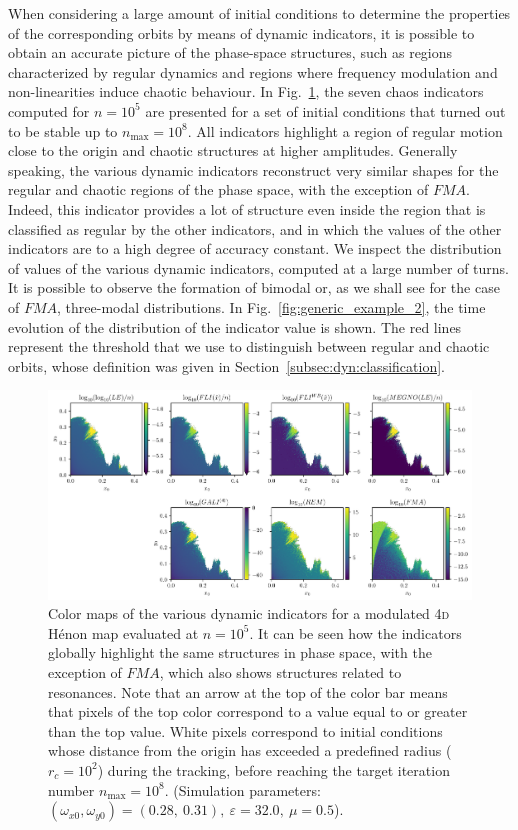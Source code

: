 \begin{chapterappendices}
When considering a large amount of initial conditions to determine the properties of the corresponding orbits by means of dynamic indicators, it is possible to obtain an accurate picture of the phase-space structures, such as regions characterized by regular dynamics and regions where frequency modulation and non-linearities induce chaotic behaviour. In Fig.~\ref{fig:generic_example}, the seven chaos indicators computed for $n=10^5$ are presented for a set of initial conditions that turned out to be stable up to $n_\text{max}=10^8$. All indicators highlight a region of regular motion close to the origin and chaotic structures at higher amplitudes. Generally speaking, the various dynamic indicators reconstruct very similar shapes for the regular and chaotic regions of the phase space, with the exception of $FMA$. Indeed, this indicator provides a lot of structure even inside the region that is classified as regular by the other indicators, and in which the values of the other indicators are to a high degree of accuracy constant. We inspect the distribution of values of the various dynamic indicators, computed at a large number of turns. It is possible to observe the formation of bimodal or, as we shall see for the case of $FMA$, three-modal distributions. In Fig.~\ref{fig:generic_example_2}, the time evolution of the distribution of the indicator value is shown. The red lines represent the threshold that we use to distinguish between regular and chaotic orbits, whose definition was given in Section~\ref{subsec:dyn:classification}.

\begin{figure}[th]
    \centering
    \includegraphics[width=\textwidth]{6_dynamic_indicators/fig/corrected_figs/overview.pdf}
    \caption{Color maps of the various dynamic indicators for a modulated 4\textsc{d} Hénon map evaluated at $n=10^5$. It can be seen how the indicators globally highlight the same structures in phase space, with the exception of $FMA$, which also shows structures related to resonances. Note that an arrow at the top of the color bar means that pixels of the top color correspond to a value equal to or greater than the top value. White pixels correspond to initial conditions whose distance from the origin has exceeded a predefined radius ($r_c=10^2$) during the tracking, before reaching the target iteration number $n_\text{max}=10^8$. (Simulation parameters: $(\omega_{x0},\omega_{y0})= (0.28,\ 0.31),\ \varepsilon=32.0,\ \mu=0.5$).}
    \label{fig:generic_example}
\end{figure}


\end{chapterappendices}
